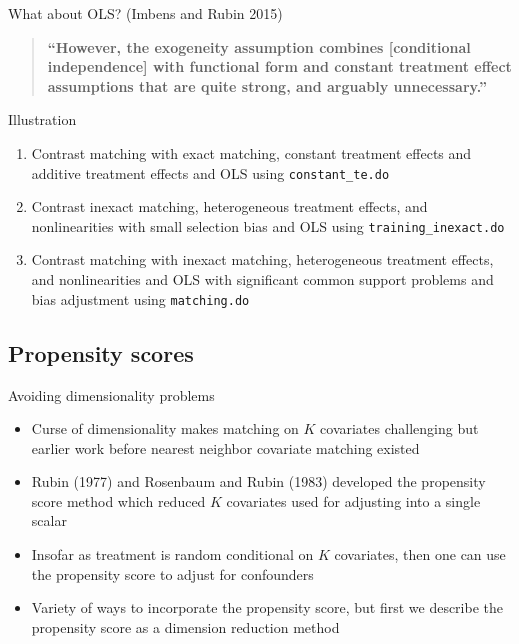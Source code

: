 \documentclass{beamer}
\begin{document}
\begin{frame}{What about OLS?  (Imbens and Rubin 2015)}

\begin{quote}
\textbf{``However, the exogeneity assumption combines [conditional independence] with functional form and constant treatment effect assumptions that are quite strong, and arguably unnecessary.''}
\end{quote}

\end{frame}

\begin{frame}{Illustration}

\begin{enumerate}

\item Contrast matching with exact matching, constant treatment effects and additive treatment effects and OLS using \texttt{constant\_te.do}
\item Contrast inexact matching, heterogeneous treatment effects, and nonlinearities with small selection bias and OLS using \texttt{training_inexact.do}
\item Contrast matching with inexact matching, heterogeneous treatment effects, and nonlinearities and OLS with significant common support problems and bias adjustment using \texttt{matching.do}

\end{enumerate}

\end{frame}


		  
\subsection{Propensity scores}

\begin{frame}{Avoiding dimensionality problems}
	
	\begin{itemize}
	\item Curse of dimensionality makes matching on $K$ covariates challenging but earlier work before nearest neighbor covariate matching existed
	\item Rubin (1977) and Rosenbaum and Rubin (1983) developed the propensity score method which reduced $K$ covariates used for adjusting into a single scalar
	\item Insofar as treatment is random conditional on $K$ covariates, then one can use the propensity score to adjust for confounders
	\item Variety of ways to incorporate the propensity score, but first we describe the propensity score as a dimension reduction method 
	\end{itemize}
	
\end{frame}
\end{document}
